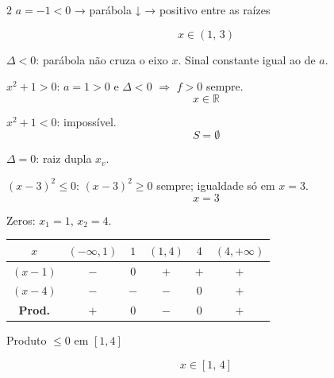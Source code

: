 \documentclass[12pt,twoside]{article}
\begin{document}
\begin{multicols}{2}
$a = -1 < 0$ → parábola ↓ → positivo entre as raízes

$$\boxed{x \in (1,\, 3)}$$


\textbf{$\Delta < 0$}: parábola não cruza o eixo $x$. Sinal constante igual ao de $a$.

$x^2 + 1 > 0$: $a = 1 > 0$ e $\Delta < 0$ $\Rightarrow$ $f > 0$ sempre.
$$\boxed{x \in \mathbb{R}}$$

$x^2 + 1 < 0$: impossível.
$$\boxed{S = \emptyset}$$

\textbf{$\Delta = 0$}: raiz dupla $x_v$.

$(x-3)^2 \leq 0$: $(x-3)^2 \geq 0$ sempre; igualdade só em $x=3$.
$$\boxed{x = 3}$$



Zeros: $x_1 = 1$, $x_2 = 4$.

\begin{center}
\renewcommand{\arraystretch}{1.2}
\begin{tabular}{|c|c|c|c|c|c|}
\hline
$x$ & $(-\infty,1)$ & $1$ & $(1,4)$ & $4$ & $(4,+\infty)$ \\ \hline
$(x-1)$ & $-$ & $0$ & $+$ & $+$ & $+$ \\ \hline
$(x-4)$ & $-$ & $-$ & $-$ & $0$ & $+$ \\ \hline
\textbf{Prod.} & $+$ & $0$ & \textcolor{verde}{$-$} & $0$ & $+$ \\ \hline
\end{tabular}
\end{center}

Produto $\leq 0$ em $[1, 4]$ \checkmark

$$\boxed{x \in [1,\, 4]}$$


\end{multicols}


\end{document}
